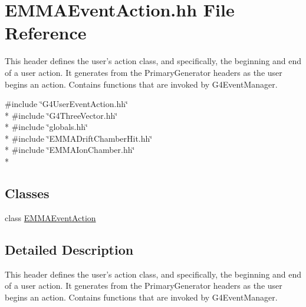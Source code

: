 \hypertarget{EMMAEventAction_8hh}{\section{E\-M\-M\-A\-Event\-Action.\-hh File Reference}
\label{EMMAEventAction_8hh}
}


This header defines the user's action class, and specifically, the beginning and end of a user action. It generates from the Primary\-Generator headers as the user begins an action. Contains functions that are invoked by G4\-Event\-Manager.  


{\ttfamily \#include \char`\"{}G4\-User\-Event\-Action.\-hh\char`\"{}}\\*
{\ttfamily \#include \char`\"{}G4\-Three\-Vector.\-hh\char`\"{}}\\*
{\ttfamily \#include \char`\"{}globals.\-hh\char`\"{}}\\*
{\ttfamily \#include \char`\"{}E\-M\-M\-A\-Drift\-Chamber\-Hit.\-hh\char`\"{}}\\*
{\ttfamily \#include \char`\"{}E\-M\-M\-A\-Ion\-Chamber.\-hh\char`\"{}}\\*
\subsection*{Classes}
\begin{DoxyCompactItemize}
\item 
class \hyperlink{classEMMAEventAction}{E\-M\-M\-A\-Event\-Action}
\end{DoxyCompactItemize}


\subsection{Detailed Description}
This header defines the user's action class, and specifically, the beginning and end of a user action. It generates from the Primary\-Generator headers as the user begins an action. Contains functions that are invoked by G4\-Event\-Manager. 